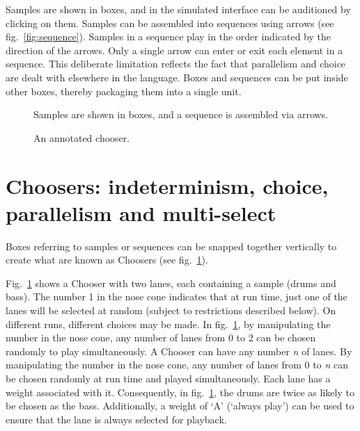 \documentclass{ppig}
\begin{document}
Samples are shown in boxes, and in the simulated interface can be
auditioned by clicking on them. Samples can be assembled into sequences
using arrows (see fig.~\ref{fig:sequence}). Samples in a sequence play
in the order indicated by the direction of the arrows. Only a single
arrow can enter or exit each element in a sequence. This deliberate
limitation reflects the fact that parallelism and choice are dealt with
elsewhere in the language. Boxes and sequences can be put inside other
boxes, thereby packaging them into a single unit.


\begin{figure}[!h]
	\begin{floatrow}
			{\caption{Samples are shown in boxes, and a sequence is assembled via
arrows.}\label{fig:sequence}}
			{\caption{An annotated chooser.}\label{fig:annotated}}
	\end{floatrow}
\end{figure}


\hypertarget{choosers-indeterminism-choice-parallelism-and-multi-select}{%
\section{Choosers: indeterminism, choice, parallelism and
multi-select}\label{choosers-indeterminism-choice-parallelism-and-multi-select}}

Boxes referring to samples or sequences can be snapped together
vertically to create what are known as Choosers (see
fig.~\ref{fig:annotated}).

Fig.~\ref{fig:annotated} shows a Chooser with two lanes, each containing
a sample (drums and bass). The number 1 in the nose cone indicates that
at run time, just one of the lanes will be selected at random (subject
to restrictions described below). On different runs, different choices
may be made. In fig.~\ref{fig:annotated}, by manipulating the number in
the nose cone, any number of lanes from 0 to 2 can be chosen randomly to
play simultaneously. A Chooser can have any number \emph{n} of lanes. By
manipulating the number in the nose cone, any number of lanes from 0 to
\emph{n} can be chosen randomly at run time and played simultaneously.
Each lane has a weight associated with it. Consequently, in
fig.~\ref{fig:annotated}, the drums are twice as likely to be chosen as
the bass. Additionally, a weight of `A' (`always play') can be used to
ensure that the lane is always selected for playback.
\end{document}
